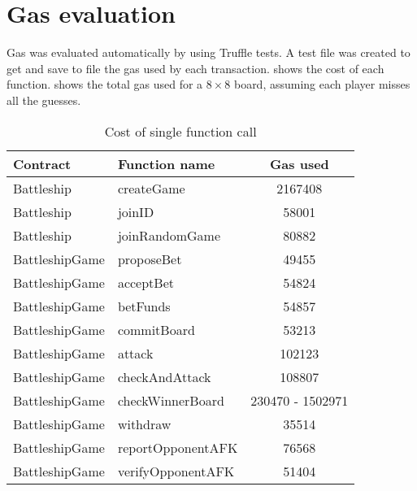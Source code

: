 \section{Gas evaluation}
Gas was evaluated automatically by using Truffle tests. A test file was created
to get and save to file the gas used by each transaction. 
shows the cost of each function.  shows the total
gas used for a $8 \times 8$ board, assuming each player misses all the guesses.

\begin{table}
	\caption{Cost of single function call}
	\label{tab:gas_costs}
	\begin{center}
		\begin{tabular}[c]{llc}\toprule
			Contract       & Function name     & Gas used         \\\midrule
			Battleship     & createGame        & 2167408          \\
			Battleship     & joinID            & 58001            \\
			Battleship     & joinRandomGame    & 80882            \\
			BattleshipGame & proposeBet        & 49455            \\
			BattleshipGame & acceptBet         & 54824            \\
			BattleshipGame & betFunds          & 54857            \\
			BattleshipGame & commitBoard       & 53213            \\
			BattleshipGame & attack            & 102123           \\
			BattleshipGame & checkAndAttack    & 108807           \\
			BattleshipGame & checkWinnerBoard  & 230470 - 1502971 \\
			BattleshipGame & withdraw          & 35514            \\
			BattleshipGame & reportOpponentAFK & 76568            \\
			BattleshipGame & verifyOpponentAFK & 51404            \\\bottomrule
		\end{tabular}
	\end{center}
\end{table}

